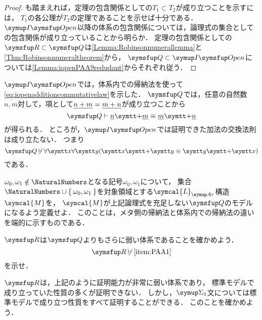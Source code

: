 \begin{proof}
	も踏まえれば，定理の包含関係としての\(T_1 \subset T_2\)が成り立つことを示すには，
	\(T_1\)の各公理が\(T_2\)の定理であることを示せば十分である．
	\(\OpenFormulaInduction\)以降の体系の包含関係については，論理式の集合としての包含関係が成り立っていることから明らか．
	定理の包含関係としての\(\RArithmetic \subset \Robinson\)は\cref{Lemma:Robinsonnumerallemma}と\cref{Thm:Robinsonnumeraltheorem}から，
	\(\Robinson \subset \OpenFormulaInduction\)については\cref{Lemma:iopenPAA9redudant}からそれぞれ従う．
\end{proof}


\begin{Que} \label{Que:Robinsoncommutativelaw}
	\(\OpenFormulaInduction\)では，体系内での帰納法を使って\cref{eq:iopenadditioncommutativelaw}を示した．
	\(\Robinson\)では，任意の自然数\(n, m\)対して，項として\(\underline{n + m} = \underline{m + n}\)が成り立つことから
	\[
		\Robinson \provable \numeral{n} \obj{+} \numeral{m} \objeq \numeral{m} \obj{+} \numeral{n}
	\]
	が得られる．
	ところが，\(\OpenFormulaInduction\)では証明できた加法の交換法則は成り立たない．
	つまり
	\[
		\Robinson \notprovable \forall \obj{x} \forall \obj{y} \paren{\obj{x} \obj{+} \obj{y} \objeq \obj{y} \obj{+} \obj{x}}
	\]
	である．

	\(\omega_0, \omega_1 \notin \NaturalNumbers\)となる記号\(\omega_0, \omega_1\)について，
	集合\(\NaturalNumbers \cup \Set{\omega_0, \omega_1}\)を対象領域とする\(\symcal{L}_{\Ar}\)構造\(\symcal{M}\)を，
	\(\symcal{M}\)が上記論理式を充足しない\(\Robinson\)のモデルになるよう定義せよ．
	このことは，メタ側の帰納法と体系内での帰納法の違いを端的に示すものである．
\end{Que}

\begin{Que} \label{Que:RArithmeticRobinson}
	\(\RArithmetic\)は\(\Robinson\)よりもさらに弱い体系であることを確かめよう．
	\[
		\RArithmetic \notprovable \text{\Cref{item:PAA1}}
	\]
	を示せ．
\end{Que}

\(\RArithmetic\)は，上記のように証明能力が非常に弱い体系であり，
標準モデルで成り立っていた性質の多くが証明できない．
しかし，\(\SigmaFormula_1\)文については標準モデルで成り立つ性質をすべて証明することができる．
このことを確かめよう．


